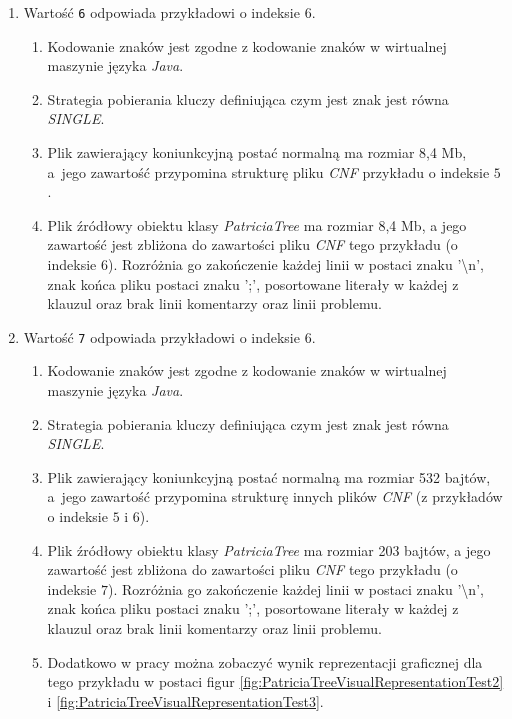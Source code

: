 \begin{enumerate}
\begin{enumerate}[label*=\arabic*.]
    	            \item Wartość \texttt{6} odpowiada przykładowi o indeksie $6$.
    	                \begin{enumerate}
    	                    \item Kodowanie znaków jest zgodne z kodowanie znaków w wirtualnej maszynie języka \emph{Java}.
    	                    \item Strategia pobierania kluczy definiująca czym jest znak jest równa \emph{SINGLE}.
    	                    \item Plik zawierający koniunkcyjną postać normalną ma rozmiar 8,4 Mb, a~jego zawartość przypomina strukturę pliku \emph{CNF} przykładu o indeksie $5$.
    	                    \item Plik źródłowy obiektu klasy \emph{PatriciaTree} ma rozmiar 8,4 Mb, a jego zawartość jest zbliżona do zawartości pliku \emph{CNF} tego przykładu (o indeksie $6$). Rozróżnia go zakończenie każdej linii w postaci znaku '\textbackslash n', znak końca pliku postaci znaku ';', posortowane literały w każdej z klauzul oraz brak linii komentarzy oraz linii problemu.
    	                \end{enumerate}
    	                
    	            \item Wartość \texttt{7} odpowiada przykładowi o indeksie $6$.
    	                \begin{enumerate}
    	                    \item Kodowanie znaków jest zgodne z kodowanie znaków w wirtualnej maszynie języka \emph{Java}.
    	                    \item Strategia pobierania kluczy definiująca czym jest znak jest równa \emph{SINGLE}.
    	                    \item Plik zawierający koniunkcyjną postać normalną ma rozmiar 532 bajtów, a~jego zawartość przypomina strukturę innych plików \emph{CNF} (z przykładów o indeksie $5$ i $6$).
    	                    \item Plik źródłowy obiektu klasy \emph{PatriciaTree} ma rozmiar 203 bajtów, a jego zawartość jest zbliżona do zawartości pliku \emph{CNF} tego przykładu (o indeksie $7$). \newpage Rozróżnia go zakończenie każdej linii w postaci znaku '\textbackslash n', znak końca pliku postaci znaku ';', posortowane literały w każdej z klauzul oraz brak linii komentarzy oraz linii problemu.
    	                    \item Dodatkowo w pracy można zobaczyć wynik reprezentacji graficznej dla tego przykładu w postaci figur \ref{fig:PatriciaTreeVisualRepresentationTest2} i \ref{fig:PatriciaTreeVisualRepresentationTest3}.
    	                \end{enumerate}
    	                

\end{enumerate}
\end{enumerate}
